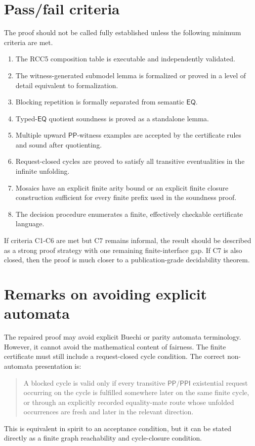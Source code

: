 \documentclass[11pt]{article}
\newcommand{\EQ}{\mathsf{EQ}}
\newcommand{\PP}{\mathsf{PP}}
\newcommand{\PPI}{\mathsf{PPI}}
\theoremstyle{definition}
\theoremstyle{plain}
\begin{document}
\section{Pass/fail criteria}

The proof should not be called fully established unless the following minimum criteria are met.

\begin{enumerate}[label=(C\arabic*)]
  \item The RCC5 composition table is executable and independently validated.
  \item The witness-generated submodel lemma is formalized or proved in a level of detail equivalent to formalization.
  \item Blocking repetition is formally separated from semantic \(\EQ\).
  \item Typed-\(\EQ\) quotient soundness is proved as a standalone lemma.
  \item Multiple upward \(\PP\)-witness examples are accepted by the certificate rules and sound after quotienting.
  \item Request-closed cycles are proved to satisfy all transitive eventualities in the infinite unfolding.
  \item Mosaics have an explicit finite arity bound or an explicit finite closure construction sufficient for every finite prefix used in the soundness proof.
  \item The decision procedure enumerates a finite, effectively checkable certificate language.
\end{enumerate}

If criteria C1-C6 are met but C7 remains informal, the result should be described as a strong proof strategy with one remaining finite-interface gap.  If C7 is also closed, then the proof is much closer to a publication-grade decidability theorem.

\section{Remarks on avoiding explicit automata}

The repaired proof may avoid explicit Buechi or parity automata terminology.  However, it cannot avoid the mathematical content of fairness.  The finite certificate must still include a request-closed cycle condition.  The correct non-automata presentation is:
\begin{quote}
A blocked cycle is valid only if every transitive \(\PP/\PPI\) existential request occurring on the cycle is fulfilled somewhere later on the same finite cycle, or through an explicitly recorded equality-mate route whose unfolded occurrences are fresh and later in the relevant direction.
\end{quote}
This is equivalent in spirit to an acceptance condition, but it can be stated directly as a finite graph reachability and cycle-closure condition.
\end{document}

